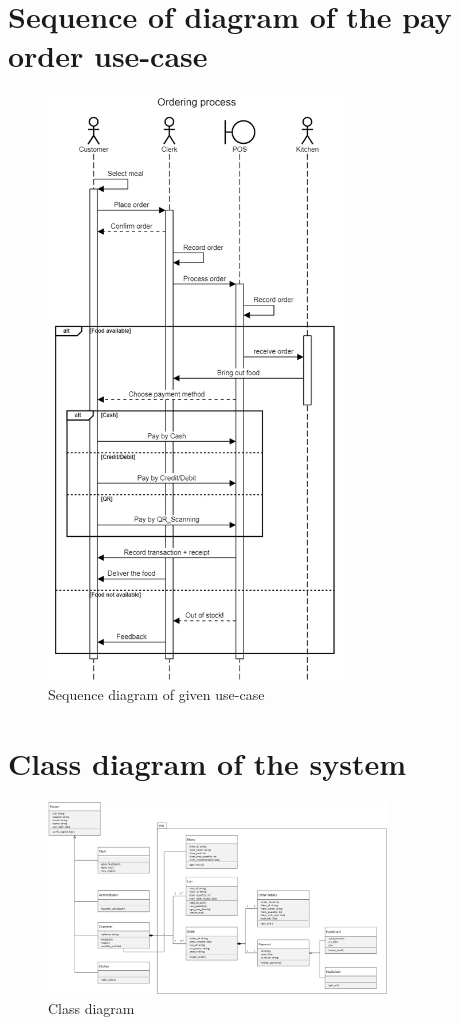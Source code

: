 \section{Sequence of diagram of the pay order use-case}
\begin{figure}[H]
  \centering
  \includegraphics[width=0.7\textwidth]{./assets/t2/sqd_2.3.png}
  \caption{Sequence diagram of given use-case}
\end{figure}

\section{Class diagram of the system}
\begin{figure}[H]
  \centering
  \includegraphics[width=0.8\textwidth]{./assets/t2/class_diag.png}
  \caption{Class diagram}
\end{figure}
